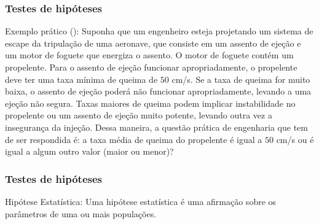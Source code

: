 \documentclass[14pt,aspectratio=1610]{beamer}
\begin{document}
\begin{frame}{}
\frametitle{Testes de hipóteses}
\begin{block}{Exemplo prático (\cite{montgomery2016}):}
\justifying
Suponha que um engenheiro esteja projetando um sistema de escape da tripulação de uma aeronave, que consiste em um assento de ejeção e um motor de foguete 
que energiza o assento. O motor de foguete contém um propelente. Para o assento de ejeção funcionar apropriadamente, o propelente deve ter uma taxa mínima de 
queima de $50$ cm/s. Se a taxa de queima for muito baixa, o assento de ejeção poderá não funcionar apropriadamente, levando a uma ejeção não segura. Taxas maiores 
de queima podem implicar instabilidade no propelente ou um assento de ejeção muito potente, levando outra vez a insegurança da injeção. Dessa maneira, a questão 
prática de engenharia que tem de ser respondida é: a taxa média de queima do propelente é igual a $50$ cm/s ou é igual a algum outro valor 
(maior ou menor)?
\end{block}
\end{frame}

\begin{frame}{}
\frametitle{Testes de hipóteses}
\begin{block}{Hipótese Estatística:}
Uma hipótese estatística é uma afirmação sobre os parâmetros de uma ou mais populações.
 \end{block}
\end{frame}
\end{document}
